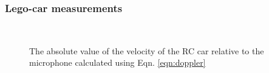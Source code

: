 \documentclass[11pt,a4paper]{article}
\begin{document}
      \subsubsection{Lego-car measurements}
    \begin{figure}[H]%
      \centering
       \\
      \caption{The absolute value of the velocity of the RC car relative to the microphone calculated using Eqn. \ref{eqn:doppler}}%
      \label{fig:rc_exp}%
    \end{figure}
\end{document}
